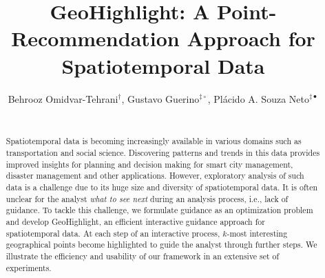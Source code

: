 \documentclass{sig-alternate-05-2015}
\begin{document}




\newtheorem{problem}{Problem}
\newtheorem{definition}{Definition}
\newtheorem{example}{Example}

\newcommand{\framework}{{\sc GeoHighlight}}
\newcommand{\pb}{{\sc GeoGuide}}

 





\title{GeoHighlight: A Point-Recommendation Approach for Spatiotemporal Data}



\author{
Behrooz Omidvar-Tehrani$^{\dag}$, Gustavo Guerino$^{\ddag \circ}$, Pl\'acido A. Souza Neto$^{\ddag \bullet}$\\
\\
}


\maketitle
\begin{abstract}
Spatiotemporal data is becoming increasingly available in various domains such as transportation and social science. Discovering patterns and trends in this data provides improved insights for planning and decision making for smart city management, disaster management and other applications. However, exploratory analysis of such data is a challenge due to its huge size and diversity of spatiotemporal data. It is often unclear for the analyst {\em what to see next} during an analysis process, i.e., lack of guidance. To tackle this challenge, we formulate guidance as an optimization problem and develop \framework, an efficient interactive guidance approach for spatiotemporal data. At each step of an interactive process, $k$-most interesting geographical points become highlighted to guide the analyst through further steps. We illustrate the efficiency and usability of our framework in an extensive set of experiments.
\end{abstract}
\end{document}
